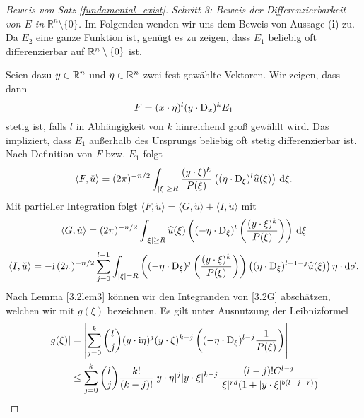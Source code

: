 \begin{proof}[Beweis von Satz \ref{fundamental_exist}]
\medskip
\noindent
{\em Schritt 3: Beweis der Differenzierbarkeit von $E$ in $\mathbb R^n\setminus\{0\}$.}
Im Folgenden wenden wir uns dem Beweis von Aussage ({\bf i}) zu. Da $E_2$ eine ganze Funktion ist, genügt es zu zeigen, dass $E_1$ beliebig oft differenzierbar auf $\mathbb R^n\setminus\{0\}$ ist.  

Seien dazu $y\in\mathbb R^n$ und $\eta\in\mathbb R^n$ zwei fest gewählte Vektoren.  Wir zeigen, dass dann
\begin{equation}
F= (x\cdot \eta)^l (y \cdot \mathrm D_x)^k E_1
\end{equation}
stetig ist, falls $l$ in Abhängigkeit von $k$ hinreichend groß gewählt wird.
Das impliziert, dass  $E_1$  außerhalb des Ursprungs beliebig oft stetig differenzierbar ist.  %
Nach Definition von $F$ bzw. $E_1$ folgt 
\begin{equation}\label{3.2F}
\langle F, \check u\rangle =  (2\pi)^{-n/2}\int_{|\xi|\ge R} \frac{(y\cdot \xi)^k}{P(\xi)} \left ( (\eta\cdot \mathrm D_\xi)^l \widehat u(\xi)\right )\,\mathrm d \xi.
\end{equation}
Mit partieller Integration folgt $\langle F,\check u\rangle=\langle G,\check u\rangle + \langle I,\check u\rangle $ mit
\begin{equation}\label{3.2G}
\langle G,\check u\rangle = (2\pi)^{-n/2} \int_{|\xi|\ge R} \widehat u(\xi) \left ( (-\eta \cdot \mathrm D_\xi)^l \left ( \frac{(y\cdot \xi)^k}{P(\xi)} \right ) \right )\,\mathrm d \xi
\end{equation}
\begin{equation}\label{3.2I}
\langle I,\check u\rangle =- \mathrm i\, (2\pi)^{-n/2} \sum_{j=0}^{l-1} \int_{|\xi|=R} \left ( (-\eta \cdot \mathrm D_\xi)^j \left ( \frac{(y\cdot \xi)^k}{P(\xi)}\right ) \right ) \left ( (\eta \cdot \mathrm D_\xi)^{l-1-j} \widehat u(\xi) \right ) \eta \cdot  \mathrm{d}\vec{\sigma}.
\end{equation}
Nach Lemma \ref{3.2lem3} können wir den Integranden von \eqref{3.2G} abschätzen, welchen wir mit $g(\xi)$ bezeichnen. Es gilt unter Ausnutzung der Leibnizformel
\begin{equation}
\begin{split}
|g(\xi)| &= \left | \sum_{j=0}^k \binom{l}{j} (y\cdot \i\eta)^j (y \cdot \xi)^{k-j} \left ( (-\eta\cdot\D_\xi)^{l-j} \frac{1}{P(\xi)} \right ) \right |\\
&\le \sum_{j=0}^k \binom{l}{j} \frac{k!}{(k-j)!} |y\cdot \eta|^j |y\cdot \xi|^{k-j}  \frac{(l-j)! C^{l-j}}{|\xi|^{rd} (1+|y\cdot \xi|^{b(l-j-r)})} 

\end{split}
\end{equation}
\end{proof}
